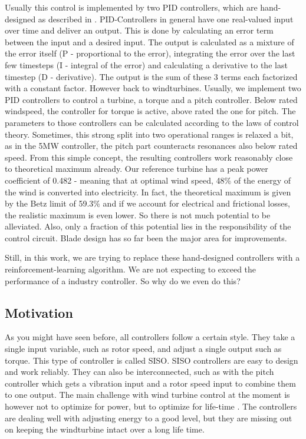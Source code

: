 \documentclass[hyperref,beleg]{cgvpub}
\begin{document}
Usually this control is implemented by two PID controllers, which are hand-designed as described in \cite[sec 8.4]{burtonWindEnergyHandbook2011}. PID-Controllers in general have one real-valued input over time and deliver an output. This is done by calculating an error term between the input and a desired input. The output is calculated as a mixture of the error itself (P - proportional to the error), integrating the error over the last few timesteps (I - integral of the error) and calculating a derivative to the last timestep (D - derivative). The output is the sum of these 3 terms each factorized with a constant factor.
However back to windturbines. Usually, we implement two PID controllers to control a turbine, a torque and a pitch controller. Below rated windspeed, the controller for torque is active, above rated the one for pitch. The parameters to those controllers can be calculated according to the laws of control theory. Sometimes, this strong split into two operational ranges is relaxed a bit, as in the 5MW controller, the pitch part counteracts resonances also below rated speed. From this simple concept, the resulting controllers work reasonably close to theoretical maximum already. Our reference turbine has a peak power coefficient of 0.482 - meaning that at optimal wind speed, 48\% of the energy of the wind is converted into electricity. In fact, the theoretical maximum is given by the Betz limit of 59.3\% and if we account for electrical and frictional losses, the realistic maximum is even lower. So there is not much potential to be alleviated. Also, only a fraction of this potential lies in the responsibility of the control circuit. Blade design has so far been the major area for improvements.

Still, in this work, we are trying to replace these hand-designed controllers with a reinforcement-learning algorithm. We are not expecting to exceed the performance of a industry controller. So why do we even do this?

\subsection{Motivation}

As you might have seen before, all controllers follow a certain style. They take a single input variable, such as rotor speed, and adjust a single output such as torque. This type of controller is called \ac{SISO}. \ac{SISO} controllers are easy to design and work reliably. They can also be interconnected, such as with the pitch controller which gets a vibration input and a rotor speed input to combine them to one output. The main challenge with wind turbine control at the moment is however not to optimize for power, but to optimize for life-time \cite[Chapter 4]{vankuikLongtermResearchChallenges2016}. The controllers are dealing well with adjusting energy to a good level, but they are missing out on keeping the windturbine intact over a long life time.
\end{document}

